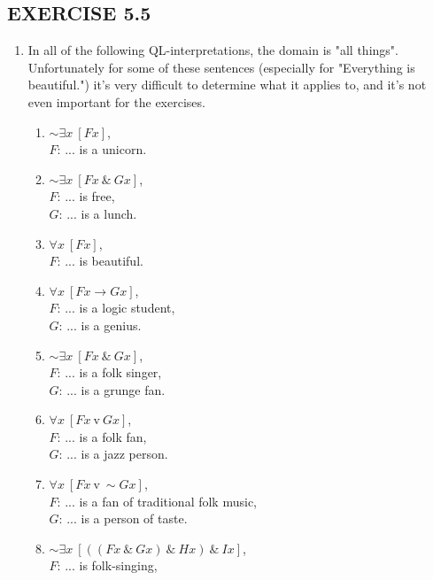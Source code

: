 \documentclass[a4paper,12pt]{article}
\newcommand{\ra}{\rightarrow}
\newcommand{\s}{\sim}
\newcommand{\tv}{ \ \textrm{v} \ }
\newcommand{\ta}{ \ \& \ }
\newcommand{\all}{\forall}
\newcommand{\ex}{\exists}
\begin{document}
    \subsection*{EXERCISE 5.5}

    \begin{enumerate}[label=\arabic*,leftmargin=*]
        \item In all of the following QL-interpretations, the domain is "all things". Unfortunately for some of these sentences (especially for "Everything is beautiful.") it's very difficult to determine what it applies to, and it's not even important for the exercises.
            \begin{enumerate}[label=(\roman*),leftmargin=*]
                \item $\s \ex x \ [Fx]$,\\
                    $F$: ... is a unicorn.
                \item $\s \ex x \ [Fx \ta Gx]$,\\
                    $F$: ... is free,\\
                    $G$: ... is a lunch.
                \item $\all x \ [Fx]$,\\
                    $F$: ... is beautiful.
                \item $\all x \ [Fx \ra Gx]$,\\
                    $F$: ... is a logic student,\\
                    $G$: ... is a genius.
                \item $\s \ex x \ [Fx \ta Gx]$,\\
                    $F$: ... is a folk singer,\\
                    $G$: ... is a grunge fan.
                \item $\all x \ [Fx \tv Gx]$,\\
                    $F$: ... is a folk fan,\\
                    $G$: ... is a jazz person.
                \item $\all x \ [Fx \tv \s Gx]$,\\
                    $F$: ... is a fan of traditional folk music,\\
                    $G$: ... is a person of taste.
                \item $\s \ex x \ [((Fx \ta Gx) \ta Hx) \ta Ix]$,\\
                    $F$: ... is folk-singing,\\

\end{enumerate}
\end{enumerate}
\end{document}
